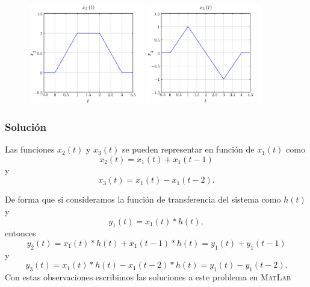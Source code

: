 \documentclass[a4paper,12pt,final]{article}
\begin{document}
    \begin{figure}[H]
      \begin{center}
        \includegraphics[width=0.45\textwidth]{./laboratorio_3/problema02_X2.png}
        \includegraphics[width=0.45\textwidth]{./laboratorio_3/problema02_X3.png}
      \end{center}
    \end{figure}

    \subsubsection*{Solución}
      \noindent Las funciones $x_2\left(t\right)$ y $x_3\left(t\right)$ se pueden representar en función de $x_1\left(t\right)$ como
      $$x_2\left(t\right) = x_1\left(t\right) + x_1\left(t - 1\right)$$
      \noindent y
      $$x_3\left(t\right) = x_1\left(t\right) - x_1\left(t - 2\right).$$

      De forma que si consideramos la función de transferencia del sistema como $h\left(t\right)$ y
      $$y_1\left(t\right) = x_1\left(t\right) * h\left(t\right),$$
      \noindent entonces
      $$y_2\left(t\right) = x_1\left(t\right) * h\left(t\right) + x_1\left(t - 1\right) * h\left(t\right) = y_1\left(t\right) + y_1\left(t - 1\right)$$
      \noindent y
      $$y_3\left(t\right) = x_1\left(t\right) * h\left(t\right) - x_1\left(t - 2\right) * h\left(t\right) = y_1\left(t\right) - y_1\left(t - 2\right).$$
      \noindent Con estas observaciones escribimos las soluciones a este problema en \textsc{MatLab}
\end{document}
